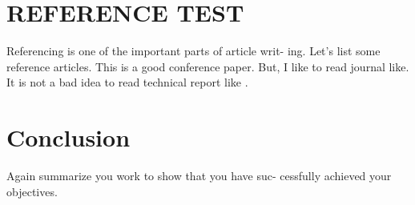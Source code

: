 \documentclass[preprint,11pt]{elsarticle}
\begin{document}
	\section{REFERENCE TEST}
	Referencing is one of the important parts of article writ-
	ing. Let's list some reference articles. This is\cite{Blum2005} a good
	conference paper. But, I like to read journal like\cite{Samarati:2001:PRI:627337.628183}. It is
	not a bad idea to read technical report like \cite{Li2011}.
	
	\section{Conclusion}
	\label{Conclusion}
	Again summarize you work to show that you have suc-
	cessfully achieved your objectives.
	
	
	
	
\end{document}
